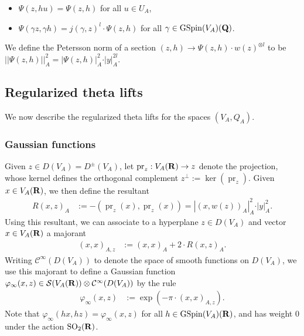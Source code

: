 \documentclass{amsart}
\theoremstyle{definition}
\begin{document}
\begin{itemize}

\item $\Psi(z, h u) = \Psi(z, h)$ for all $u \in U_A$, 

\item $\Psi(\gamma z, \gamma h) = j(\gamma, z)^l \cdot \Psi(z, h)$ for all $\gamma \in \operatorname{GSpin}(V_A)({\bf{Q}})$.

\end{itemize} 

We define the Petersson norm of a section $(z, h) \rightarrow \Psi(z, h) \cdot w(z)^{\otimes l}$ to be  
$\vert \vert \Psi(z, h) \vert \vert_A^2 = \vert \Psi(z, h) \vert_A^2 \cdot \vert y \vert_A^{2l}$.

\subsection{Regularized theta lifts} 

We now describe the regularized theta lifts for the spaces $(V_A, Q_A)$.

\subsubsection{Gaussian functions}

Given $z \in D(V_A) = D^{\pm}(V_A)$, let $\operatorname{pr}_z : V_A({\bf{R}}) \rightarrow z$ 
denote the projection, whose kernel defines the orthogonal complement $z^{\perp} := \ker(\operatorname{pr}_z)$. 
Given $x \in V_A({\bf{R}})$, we then define the resultant
\begin{align*} R(x, z)_A &:= - \left( \operatorname{pr}_z(x), \operatorname{pr}_z(x) \right) = \left\vert  (x, w(z))_A \right\vert_A^2 \cdot \vert y \vert_A^2.\end{align*}
Using this resultant, we can associate to a hyperplane $z \in D(V_A)$ and vector $x \in V_A({\bf{R}})$ a majorant
\begin{align*} \left( x, x \right)_{A, z} &:= (x, x)_A + 2 \cdot R(x, z)_A. \end{align*}
Writing $\mathcal{C}^{\infty}(D(V_A))$ to denote the space of smooth functions on $D(V_A)$,
we use this majorant to define a Gaussian function 
$\varphi_{\infty}(x, z) \in \mathcal{S}(V_A( {\bf{R}} ) ) \otimes \mathcal{C}^{\infty}(D(V_A))$ by the rule
\begin{align*} \varphi_{\infty}(x, z) &:= \exp \left( - \pi \cdot \left(x, x \right)_{A, z} \right). \end{align*}
Note that $\varphi_{\infty}(h x, h z) = \varphi_{\infty}(x, z)$ for all $h \in \operatorname{GSpin}(V_A)({\bf{R}})$,
and has weight $0$ under the action $\operatorname{SO}_2({\bf{R}})$. 
\end{document}
